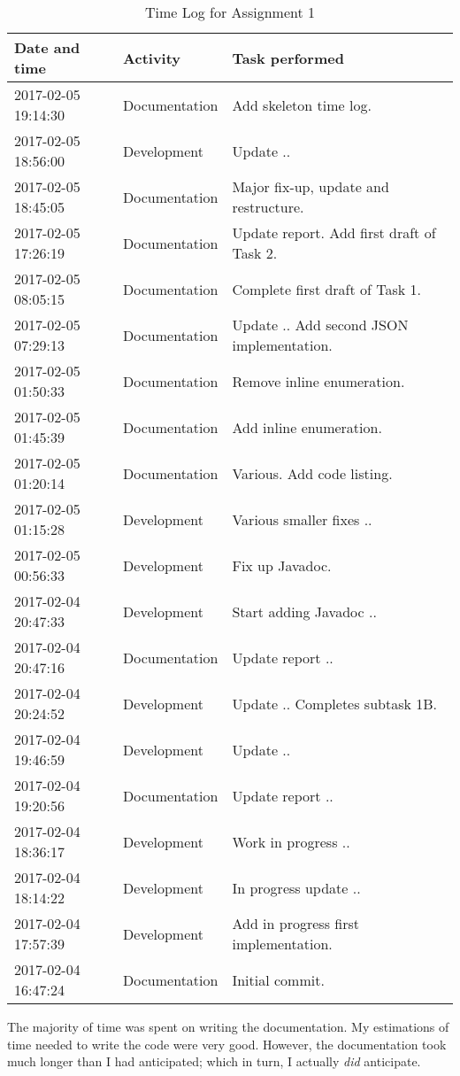 \begin{table}[]
  \centering
  \caption{Time Log for Assignment 1}
  \label{table-timelog}
  \begin{tabular}{@{}l|l|l}
    \toprule
    Date and time       & Activity      & Task performed                             \\ \midrule
    2017-02-05 19:14:30 & Documentation & Add skeleton time log.                     \\ 
    2017-02-05 18:56:00 & Development   & Update ..                                  \\ 
    2017-02-05 18:45:05 & Documentation & Major fix-up, update and restructure.      \\ 
    2017-02-05 17:26:19 & Documentation & Update report. Add first draft of Task 2.  \\ 
    2017-02-05 08:05:15 & Documentation & Complete first draft of Task 1.            \\ 
    2017-02-05 07:29:13 & Documentation & Update .. Add second JSON implementation.  \\ 
    2017-02-05 01:50:33 & Documentation & Remove inline enumeration.                 \\ 
    2017-02-05 01:45:39 & Documentation & Add inline enumeration.                    \\ 
    2017-02-05 01:20:14 & Documentation & Various. Add code listing.                 \\ 
    2017-02-05 01:15:28 & Development   & Various smaller fixes ..                   \\ 
    2017-02-05 00:56:33 & Development   & Fix up Javadoc.                            \\ 
    2017-02-04 20:47:33 & Development   & Start adding Javadoc ..                    \\ 
    2017-02-04 20:47:16 & Documentation & Update report ..                           \\ 
    2017-02-04 20:24:52 & Development   & Update .. Completes subtask 1B.            \\ 
    2017-02-04 19:46:59 & Development   & Update ..                                  \\ 
    2017-02-04 19:20:56 & Documentation & Update report ..                           \\ 
    2017-02-04 18:36:17 & Development   & Work in progress ..                        \\ 
    2017-02-04 18:14:22 & Development   & In progress update ..                      \\ 
    2017-02-04 17:57:39 & Development   & Add in progress first implementation.      \\ 
    2017-02-04 16:47:24 & Documentation & Initial commit.                            \\ \bottomrule
  \end{tabular}
\end{table}

The majority of time was spent on writing the documentation. My estimations of
time needed to write the code were very good. However, the documentation took
much longer than I had anticipated; which in turn, I actually \emph{did}
anticipate.

